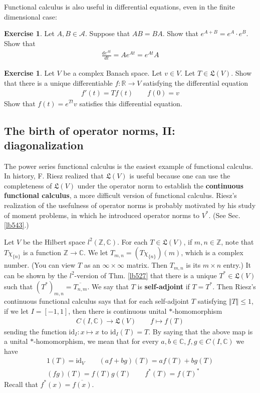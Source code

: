 \documentclass[12pt,b5paper,notitlepage]{article}
\theoremstyle{definition}
\newtheorem{exe}[df]{Exercise}
\theoremstyle{plain}
\newcommand{\fk}{\mathfrak}
\newcommand{\ovl}{\overline}
\newcommand{\id}{\mathrm{id}}
\newcommand{\scr}{\mathscr}
\newcommand{\Cbb}{\mathbb C}
\newcommand{\Zbb}{\mathbb Z}
\newcommand{\Rbb}{\mathbb R}
\numberwithin{equation}{section}
\begin{document}
Functional calculus is also useful in differential equations, even in the finite dimensional case:


\begin{exe}\label{lb582}
Let $A,B\in\scr A$.  Suppose that $AB=BA$. Show that $e^{A+B}=e^A\cdot e^B$. Show that
\begin{align*}
\frac {d e^{At}}{dt}=Ae^{At}=e^{At}A
\end{align*}
\end{exe}

\begin{exe}
Let $V$ be a complex Banach space. Let $v\in V$. Let $T\in\fk L(V)$. Show that there is a unique differentiable $f:\Rbb\rightarrow V$ satisfying the differential equation
\begin{align*}
f'(t)=Tf(t)\qquad f(0)=v
\end{align*}
Show that $f(t)=e^{Tt}v$ satisfies this differential equation.
\end{exe}


\subsection{The birth of operator norms, II: diagonalization}\label{lb551}




The power series functional calculus is the easiest example of functional calculus. In history, F. Riesz realized that $\fk L(V)$ is useful because one can use the completeness of $\fk L(V)$ under the operator norm to establish the \textbf{continuous functional calculus}, a more difficult version of functional calculus. Riesz's realization of the usefulness of operator norms is probably motivated by his study of moment problems, in which he introduced operator norms to $V^*$. (See Sec. \ref{lb543}.)

Let $V$ be the Hilbert space $l^2(\Zbb,\Cbb)$. For each $T\in\fk L(V)$, if $m,n\in\Zbb$, note that $T\chi_{\{n\}}$ is a function $\Zbb\rightarrow\Cbb$. We let $T_{m,n}=(T\chi_{\{n\}})(m)$, which is a complex number. (You can view $T$ as an $\infty\times\infty$ matrix. Then $T_{m,n}$ is its $m\times n$ entry.) It can be shown by the $l^2$-version of Thm. \ref{lb527} that there is a unique $T^*\in\fk L(V)$ such that $(T^*)_{m,n}=\ovl{T_{n,m}}$. We say that $T$ is \textbf{self-adjoint} if $T=T^*$. Then Riesz's continuous functional calculus says that for each self-adjoint $T$ satisfying $\Vert T\Vert\leq 1$, if we let $I=[-1,1]$, then there is continuous unital $*$-homomorphism
\begin{align*}
C(I,\Cbb)\rightarrow \fk L(V)\qquad f\mapsto f(T)
\end{align*}
sending the function $\id_I:x\mapsto x$ to $\id_I(T)=T$. By saying that the above map is a unital $*$-homomorphism, we mean that for every $a,b\in\Cbb,f,g\in C(I,\Cbb)$ we have
\begin{gather*}
1(T)=\id_V\qquad (af+bg)(T)=af(T)+bg(T)\\
(fg)(T)=f(T)g(T)\qquad f^*(T)=f(T)^*
\end{gather*}
Recall that $f^*(x)=\ovl {f(x)}$. 
\end{document}
